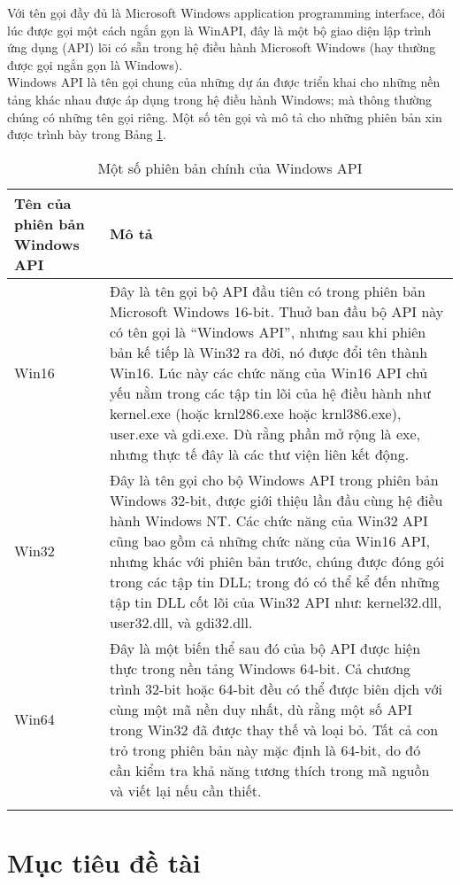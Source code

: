 Với tên gọi đầy đủ là Microsoft Windows application programming interface, đôi lúc được gọi một cách ngắn gọn là WinAPI, đây là một bộ giao diện lập trình ứng dụng (API) lõi có sẵn trong hệ điều hành Microsoft Windows (hay thường được gọi ngắn gọn là Windows).\\

Windows API là tên gọi chung của những dự án được triển khai cho những nền tảng khác nhau được áp dụng trong hệ điều hành Windows; mà thông thường chúng có những tên gọi riêng. Một số tên gọi và mô tả cho những phiên bản xin được trình bày trong Bảng \ref{table:tblwapiver}.\\

\newpage

\begin{longtable}{ | m{3cm} | m{11cm} | }
	\hline
Tên của phiên bản Windows API & Mô tả \\
	\hline
	\hline
Win16 & Đây là tên gọi bộ API đầu tiên có trong phiên bản Microsoft Windows 16-bit. Thuở ban đầu bộ API này có tên gọi là “Windows API”, nhưng sau khi phiên bản kế tiếp là Win32 ra đời, nó được đổi tên thành Win16. Lúc này các chức năng của Win16 API chủ yếu nằm trong các tập tin lõi của hệ điều hành như kernel.exe (hoặc krnl286.exe hoặc krnl386.exe), user.exe và gdi.exe. Dù rằng phần mở rộng là exe, nhưng thực tế đây là các thư viện liên kết động. \\
	\hline
Win32 & Đây là tên gọi cho bộ Windows API trong phiên bản Windows 32-bit, được giới thiệu lần đầu cùng hệ điều hành Windows NT. Các chức năng của Win32 API cũng bao gồm cả những chức năng của Win16 API, nhưng khác với phiên bản trước, chúng được đóng gói trong các tập tin DLL; trong đó có thể kể đến những tập tin DLL cốt lõi của Win32 API như: kernel32.dll, user32.dll, và gdi32.dll. \\
	\hline
Win64 & Đây là một biến thể sau đó của bộ API được hiện thực trong nền tảng Windows 64-bit. Cả chương trình 32-bit hoặc 64-bit đều có thể được biên dịch với cùng một mã nền duy nhất, dù rằng một số API trong Win32 đã được thay thế và loại bỏ. Tất cả con trỏ trong phiên bản này mặc định là 64-bit, do đó cần kiểm tra khả năng tương thích trong mã nguồn và viết lại nếu cần thiết. \\
	\hline

\caption[Một số phiên bản chính của Windows API]{Một số phiên bản chính của Windows API}
\label{table:tblwapiver}
\end{longtable}

\section{Mục tiêu đề tài}


